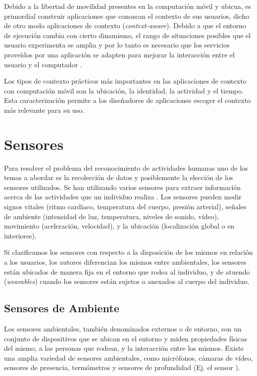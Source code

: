 Debido a la libertad de movilidad presentes en la computación móvil
y ubicua, es primordial construir aplicaciones que conozcan el contexto
de sus usuarios, dicho de otro modo aplicaciones de contexto (\emph{context-aware}).
Debido a que el entorno de ejecución cambia con cierto dinamismo,
el rango de situaciones posibles que el usuario experimenta se amplia
y por lo tanto es necesario que los servicios proveídos por una aplicación
se adapten para mejorar la interacción entre el usuario y el computador
\cite{Dey2000}.

Los tipos de contexto prácticos más importantes en las aplicaciones
de contexto con computación móvil son la ubicación, la identidad,
la actividad y el tiempo. Esta caracterización permite a los diseñadores
de aplicaciones escoger el contexto más relevante para su uso.

\section{Sensores}

\label{sec23:sensores} Para resolver el problema del reconocimiento
de actividades humanas uno de los temas a abordar es la recolección
de datos y posiblemente la elección de los sensores utilizados. Se
han utilizando varios sensores para extraer información acerca de
las actividades que un individuo realiza \cite{Chen2012,LaraLabrador2012}.
Los sensores pueden medir signos vitales (ritmo cardíaco, temperatura
del cuerpo, presión arterial), señales de ambiente (intensidad de
luz, temperatura, niveles de sonido, vídeo), movimiento (aceleración,
velocidad), y la ubicación (localización global o en interiores). 

Si clasificamos los sensores con respecto a la disposición de los
mismos en relación a los usuarios, los autores \cite{ReyesOrtiz2015,LaraLabrador2013}
diferencian los mismos entre ambientales, los sensores están ubicados
de manera fija en el entorno que rodea al individuo, y de atuendo
(\emph{wearables}) cuando los sensores están sujetos o anexados al
cuerpo del individuo.

\subsection{Sensores de Ambiente}

Los sensores ambientales, también denominados externos o de entorno,
son un conjunto de dispositivos que se ubican en el entorno y miden
propiedades físicas del mismo, a las personas que rodean, y la interacción
entre los mismos. Existe una amplia variedad de sensores ambientales,
como micrófonos, cámaras de vídeo, sensores de presencia, termómetros
y sensores de profundidad (Ej. el sensor ). 

